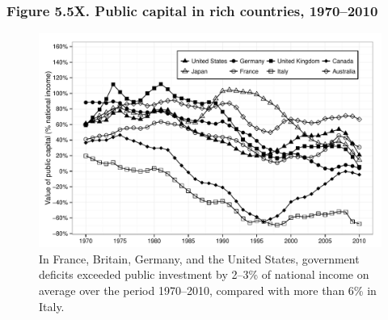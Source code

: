 \documentclass[t]{beamer}\usepackage[]{graphicx}\usepackage[]{color}
\newenvironment{knitrout}{}{} %
\begin{document}
\begin{frame}[label=Figure_5_5X]
\frametitle{Figure 5.5X. Public capital in rich countries, 1970--2010}
\begin{figure}[t]
\begin{minipage}[b]{\textwidth}
\centering
\begin{knitrout}\footnotesize
{}\color{fgcolor}

{\centering \includegraphics[width=1\linewidth]{figures/bw/Figure_5_5X} 

}



\end{knitrout}
\caption{In France, Britain, Germany, and the United States, government deficits exceeded public investment by 2--3\% of national income on average over the period 1970--2010, compared with more than 6\% in Italy.}
\end{minipage}
\end{figure}
\end{frame}
\end{document}
